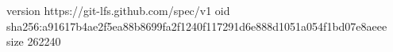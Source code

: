 version https://git-lfs.github.com/spec/v1
oid sha256:a91617b4ae2f5ea88b8699fa2f1240f117291d6e888d1051a054f1bd07e8aeee
size 262240
